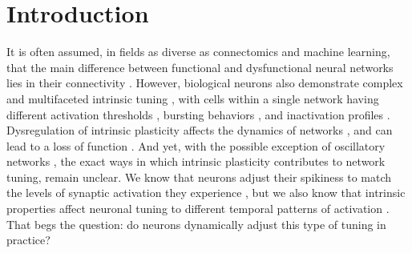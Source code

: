 \documentclass{article}
\begin{document}
\begin{flushleft}



\bigskip

\end{flushleft} %

\section*{Introduction}

It is often assumed, in fields as diverse as connectomics and machine learning, that the main difference between functional and dysfunctional neural networks lies in their connectivity \citep{takemura2014,hildebrand2017,bassett2017network,reimann2017}. However, biological neurons also demonstrate complex and multifaceted intrinsic tuning  \citep{oleary2013,evans2015}, with cells within a single network having different activation thresholds \citep{kole2012}, bursting behaviors \citep{popovic2011}, and inactivation profiles \citep{bianchi2012}. Dysregulation of intrinsic plasticity affects the dynamics of networks  \citep{tien2018}, and can lead to a loss of function \citep{marcelin2009}. And yet, with the possible exception of oscillatory networks \citep{marder2011,picton2018control}, the exact ways in which intrinsic plasticity contributes to network tuning, remain unclear. We know that neurons adjust their spikiness to match the levels of synaptic activation they experience \citep{aizenman2003,titley2017}, but we also know that intrinsic properties affect neuronal tuning to different temporal patterns of activation \citep{azouz2000threshold,branco2010dendritic,fontaine2014threshold,jarvis2018morphology,ohtsuki2018bursting,zbili2019axonnav}. That begs the question: do neurons dynamically adjust this type of tuning in practice?
\end{document}
